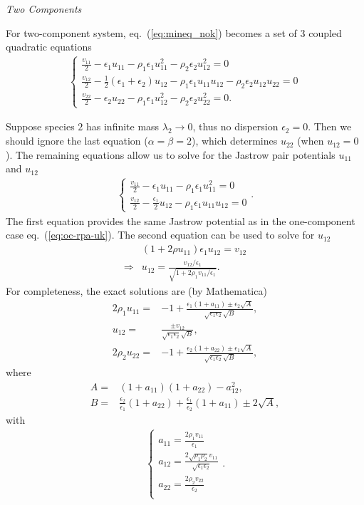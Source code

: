 \textit{Two Components}

For two-component system, eq.~(\ref{eq:mineq_nok}) becomes a set of 3 coupled quadratic equations
\begin{align}
\left\{\begin{array}{l}
\frac{v_{11}}{2} - \epsilon_1 u_{11} - \rho_1\epsilon_1u_{11}^2 - \rho_2\epsilon_2u_{12}^2 = 0 \\
\frac{v_{12}}{2} - \frac{1}{2}(\epsilon_1+\epsilon_2) u_{12} - \rho_1\epsilon_1u_{11}u_{12} - \rho_2\epsilon_2u_{12}u_{22} = 0 \\
\frac{v_{22}}{2} - \epsilon_2 u_{22} - \rho_1\epsilon_1u_{12}^2 - \rho_2\epsilon_2u_{22}^2 = 0.
\end{array}\right.
\end{align}

Suppose species $2$ has infinite mass $\lambda_2\rightarrow0$, thus no dispersion $\epsilon_2=0$. Then we should ignore the last equation ($\alpha=\beta=2$), which determines $u_{22}$ (when $u_{12}=0$). The remaining equations allow us to solve for the Jastrow pair potentials $u_{11}$ and $u_{12}$
\begin{align}
\left\{\begin{array}{l}
\frac{v_{11}}{2} - \epsilon_1 u_{11} - \rho_1\epsilon_1u_{11}^2 = 0 \\
\frac{v_{12}}{2} - \frac{\epsilon_1}{2} u_{12} - \rho_1\epsilon_1u_{11}u_{12} = 0
\end{array}\right..
\end{align}
The first equation provides the same Jastrow potential as in the one-component case eq.~(\ref{eq:oc-rpa-uk}). The second equation can be used to solve for $u_{12}$
\begin{align}
&(1+2\rho u_{11}) \epsilon_1 u_{12} = v_{12} \nonumber \\
\Rightarrow & u_{12} = \frac{v_{12}/\epsilon_1}{\sqrt{1+2\rho_1v_{11}/\epsilon_1}}.
\end{align}
For completeness, the exact solutions are (by Mathematica)
\begin{align}
2\rho_1u_{11} =& -1+\frac{\epsilon_1(1+a_{11}) \pm \epsilon_2\sqrt{A}}
{
\sqrt{\epsilon_1\epsilon_2}\sqrt{B}
},\\
u_{12} =& \frac{\pm v_{12} }{
\sqrt{\epsilon_1\epsilon_2}\sqrt{B}
},\\
2\rho_2u_{22} =& -1+\frac{\epsilon_2(1+a_{22}) \pm \epsilon_1\sqrt{A}}
{
\sqrt{\epsilon_1\epsilon_2}\sqrt{B}
},
\end{align}
where 
\begin{align}
A =& (1+a_{11})(1+a_{22})-a_{12}^2,\\
B =&\frac{\epsilon_2}{\epsilon_1}(1+a_{22}) + \frac{\epsilon_1}{\epsilon_2}(1+a_{11}) \pm 2\sqrt{A},
\end{align}
with
\begin{align}
\left\{\begin{array}{l}
a_{11}=\frac{2\rho_1v_{11}}{\epsilon_1} \\
a_{12}=\frac{2\sqrt{\rho_1\rho_2}v_{11}}{\sqrt{\epsilon_1\epsilon_2}} \\
a_{22}=\frac{2\rho_2v_{22}}{\epsilon_2} \\
\end{array}\right..
\end{align}